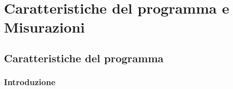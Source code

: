 \section{Caratteristiche del programma e Misurazioni}

\subsection{Caratteristiche del programma}

\subsubsection{Introduzione}






